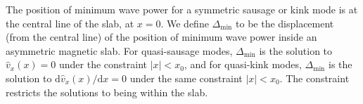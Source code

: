 \documentclass[namedreferences]{solarphysics}
\numberwithin{equation}{section}
\begin{document}
\begin{article}
The position of minimum wave power for a symmetric sausage or kink mode is at the central line of the slab, at $x=0$. We define $\Delta_\textrm{min}$ to be the displacement (from the central line) of the position of minimum wave power inside an asymmetric magnetic slab. For quasi-sausage modes, $\Delta_\textrm{min}$ is the solution to $\widehat{v}_x(x) = 0$ under the constraint $|x| < x_0$, and for quasi-kink modes, $\Delta_\textrm{min}$ is the solution to $\textrm{d}\widehat{v}_x (x) / \textrm{d}x = 0$ under the same constraint $|x| < x_0$. The constraint restricts the solutions to being within the slab. 

\begin{figure}
\end{figure}
\end{article}
\end{document}
